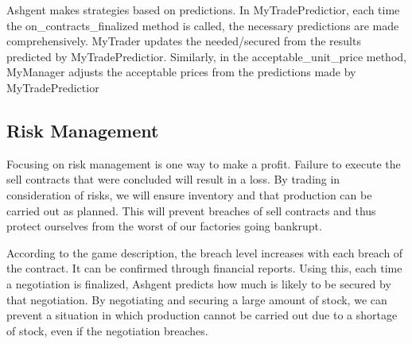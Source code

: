 \documentclass[10pt]{article}
\begin{document}
Ashgent makes strategies based on predictions.
In MyTradePredictior, each time the on\_contracts\_finalized method is called, the necessary predictions are made comprehensively.
MyTrader updates the needed/secured from the results predicted by MyTradePredictior.
Similarly, in the acceptable\_unit\_price method, MyManager adjusts the acceptable prices from the predictions made by MyTradePredictior


\subsection{Risk Management}
Focusing on risk management is one way to make a profit.
Failure to execute the sell contracts that were concluded will result in a loss.
By trading in consideration of risks, we will ensure inventory and that production can be carried out as planned.
This will prevent breaches of sell contracts and thus protect ourselves from the worst of our factories going bankrupt.

According to the game description, the breach level increases with each breach of the contract. %
It can be confirmed through financial reports.
Using this, each time a negotiation is finalized, Ashgent predicts how much is likely to be secured by that negotiation.
By negotiating and securing a large amount of stock, we can prevent a situation in which production cannot be carried out due to a shortage of stock, even if the negotiation breaches.
\end{document}
